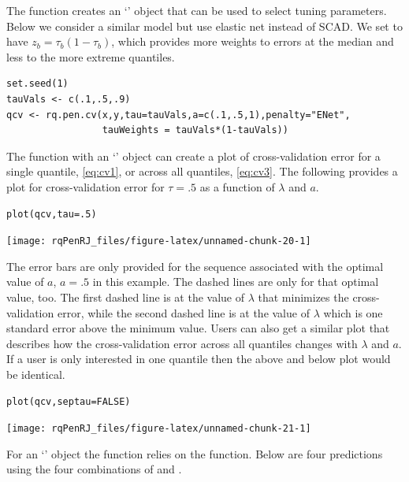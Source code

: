 The function  creates an `' object that can be used to select tuning parameters. Below we consider a similar model but use elastic net instead of SCAD. We set  to have \(z_b=\tau_b(1-\tau_b)\), which provides more weights to errors at the median and less to the more extreme quantiles.

\begin{verbatim}
set.seed(1)
tauVals <- c(.1,.5,.9)
qcv <- rq.pen.cv(x,y,tau=tauVals,a=c(.1,.5,1),penalty="ENet",
                 tauWeights = tauVals*(1-tauVals))
\end{verbatim}

The  function with an `' object can create a plot of cross-validation error for a single quantile, \eqref{eq:cv1}, or across all quantiles, \eqref{eq:cv3}. The following provides a plot for cross-validation error for \(\tau=.5\) as a function of \(\lambda\) and \(a\).

\begin{verbatim}
plot(qcv,tau=.5)
\end{verbatim}

\begin{center}\texttt{[image: rqPenRJ\_files/figure-latex/unnamed-chunk-20-1]} \end{center}

The error bars are only provided for the sequence associated with the optimal value of \(a\), \(a=.5\) in this example. The dashed lines are only for that optimal value, too. The first dashed line is at the value of \(\lambda\) that minimizes the cross-validation error, while the second dashed line is at the value of \(\lambda\) which is one standard error above the minimum value. Users can also get a similar plot that describes how the cross-validation error across all quantiles changes with \(\lambda\) and \(a\). If a user is only interested in one quantile then the above and below plot would be identical.

\begin{verbatim}
plot(qcv,septau=FALSE)
\end{verbatim}

\begin{center}\texttt{[image: rqPenRJ\_files/figure-latex/unnamed-chunk-21-1]} \end{center}

For an `' object the  function relies on the  function. Below are four predictions using the four combinations of  and .

